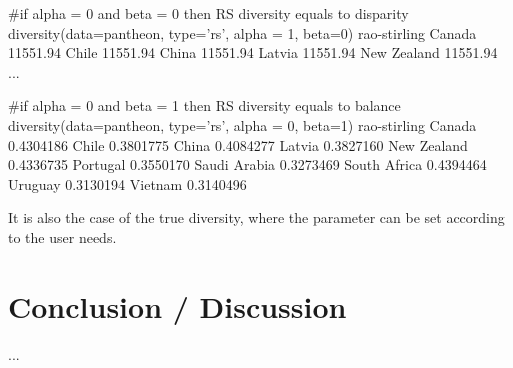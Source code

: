 \begin{example}
  #if alpha = 0 and beta = 0 then RS diversity equals to disparity
  diversity(data=pantheon, type='rs', alpha = 1, beta=0)
               rao-stirling
Canada           11551.94
Chile            11551.94
China            11551.94
Latvia           11551.94
New Zealand      11551.94
...

  #if alpha = 0 and beta = 1 then RS diversity equals to balance
  diversity(data=pantheon, type='rs', alpha = 0, beta=1)
rao-stirling
Canada          0.4304186
Chile           0.3801775
China           0.4084277
Latvia          0.3827160
New Zealand     0.4336735
Portugal        0.3550170
Saudi Arabia    0.3273469
South Africa    0.4394464
Uruguay         0.3130194
Vietnam         0.3140496
\end{example}

It is also the case of the true diversity, where the parameter  can be set according to the user needs.

\section{Conclusion / Discussion}

...








\address{Miguel R. Guevara\\
  Universidad de Playa Ancha and Universidad Federico Santa María\\
  Valparaíso\\
  Chile\\}

\address{Dominik Hartmann\\
  Chair for Economics of Innovation, University of Hohenheim\\
  Wollgrasweg 23, 70599, Stuttgart\\
  Germany\\}

\address{Marcelo Mendoza\\
  Universidad Federico Santa María\\
  Av. Vicuna Mackenna 3939, San Joaquin, Santiago\\
  Chile\\}


